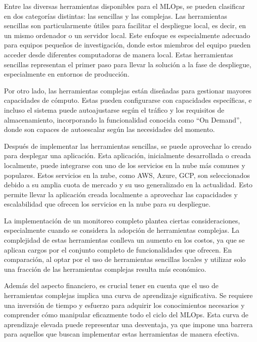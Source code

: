 Entre las diversas herramientas disponibles para el MLOps, se pueden clasificar en dos categorías distintas: las sencillas y las complejas. Las herramientas sencillas son particularmente útiles para facilitar el despliegue local, es decir, en un mismo ordenador o un servidor local. Este enfoque es especialmente adecuado para equipos pequeños de investigación, donde estos miembros del equipo pueden acceder desde diferentes computadoras de manera local. Estas herramientas sencillas representan el primer paso para llevar la solución a la fase de despliegue, especialmente en entornos de producción.

Por otro lado, las herramientas complejas están diseñadas para gestionar mayores capacidades de cómputo. Estas pueden configurarse con capacidades específicas, e incluso el sistema puede autoajustarse según el tráfico y los requisitos de almacenamiento, incorporando la funcionalidad conocida como ``On Demand'', donde son capaces de autoescalar según las necesidades del momento. 

Después de implementar las herramientas sencillas, se puede aprovechar lo creado para desplegar una aplicación. Esta aplicación, inicialmente desarrollada o creada localmente, puede integrarse con uno de los servicios en la nube más comunes y populares. Estos servicios en la nube, como AWS, Azure, GCP, son seleccionados debido a su amplia cuota de mercado y su uso generalizado en la actualidad. Esto permite llevar la aplicación creada localmente a aprovechar las capacidades y escalabilidad que ofrecen los servicios en la nube para su despliegue.

\newpage

La implementación de un monitoreo completo plantea ciertas consideraciones, especialmente cuando se considera la adopción de herramientas complejas. La complejidad de estas herramientas conlleva un aumento en los costos, ya que se aplican cargos por el conjunto completo de funcionalidades que ofrecen. En comparación, al optar por el uso de herramientas sencillas locales y utilizar solo una fracción de las herramientas complejas resulta más económico.

Además del aspecto financiero, es crucial tener en cuenta que el uso de herramientas complejas implica una curva de aprendizaje significativa. Se requiere una inversión de tiempo y esfuerzo para adquirir los conocimientos necesarios y comprender cómo manipular eficazmente todo el ciclo del MLOps. Esta curva de aprendizaje elevada puede representar una desventaja, ya que impone una barrera para aquellos que buscan implementar estas herramientas de manera efectiva.


